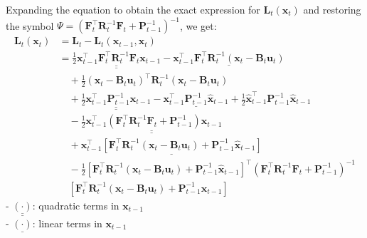\documentclass[10pt]{article}
\begin{document}
Expanding the equation to obtain the exact expression for $\mathbf{L}_t(\mathbf{x}_t)$ and restoring the symbol $\Psi = (\mathbf{F}^{\intercal}_t\mathbf{R}_t^{-1} \mathbf{F}_t+ \mathbf{P}_{t-1}^{-1})^{-1}$, we get:
\begin{equation}
	\begin{aligned}
		\mathbf{L}_t(\mathbf{x}_t) & = \mathbf{L}_t - \mathbf{L}_t(\mathbf{x}_{t-1}, \mathbf{x}_t) \\
		& = \underline{\underline{\frac{1}{2}\mathbf{x}_{t-1}^{\intercal}\mathbf{F}_t^{\intercal}\mathbf{R}_t^{-1}\mathbf{F}_t\mathbf{x}_{t-1} }} - \underline{ \mathbf{x}_{t-1}^{\intercal}\mathbf{F}_t^{\intercal}\mathbf{R}_t^{-1}(\mathbf{x}_t - \mathbf{B}_t \mathbf{u}_t) } \\
		& \quad + \frac{1}{2}(\mathbf{x}_t - \mathbf{B}_t\mathbf{u}_t)^{\intercal}\mathbf{R}_t^{-1}(\mathbf{x}_t - \mathbf{B}_t \mathbf{u}_t) \\
		& \quad + \underline{\underline{ \frac{1}{2} \mathbf{x}_{t-1}^{\intercal}\mathbf{P}_{t-1}^{-1}\mathbf{x}_{t-1} }} - \underline{ \mathbf{x}_{t-1}^{\intercal} \mathbf{P}_{t-1}^{-1}\hat{\mathbf{x}}_{t-1} } + \frac{1}{2}\hat{\mathbf{x}}_{t-1}^{\intercal} \mathbf{P}_{t-1}^{-1} \hat{\mathbf{x}}_{t-1} \\
		& \quad - \underline{\underline{ \frac{1}{2}\mathbf{x}_{t-1}^{\intercal} (\mathbf{F}_t^{\intercal}\mathbf{R}_t^{-1}\mathbf{F}_t + \mathbf{P}_{t-1}^{-1})\mathbf{x}_{t-1} }} \\
		& \quad + \underline{ \mathbf{x}_{t-1}^{\intercal}[\mathbf{F}_t^{\intercal}\mathbf{R}_t^{-1}(\mathbf{x}_t - \mathbf{B}_t \mathbf{u}_t) + \mathbf{P}_{t-1}^{-1}\hat{\mathbf{x}}_{t-1}] } \\
		& \quad -\frac{1}{2} [ \mathbf{F}_t^{\intercal}\mathbf{R}_t^{-1}(\mathbf{x}_t - \mathbf{B}_t \mathbf{u}_t) + \mathbf{P}_{t-1}^{-1}\hat{\mathbf{x}}_{t-1}]^{\intercal} (\mathbf{F}_t^{\intercal} \mathbf{R}_t^{-1}\mathbf{F}_t + \mathbf{P}_{t-1}^{-1})^{-1} \\
		& \quad [ \mathbf{F}_t^{\intercal}\mathbf{R}_t^{-1}(\mathbf{x}_t - \mathbf{B}_t \mathbf{u}_t) + \mathbf{P}_{t-1}^{-1}\hat{\mathbf{x}}_{t-1}]
	\end{aligned}
\end{equation}
- $\underline{\underline{(\cdot)}}$: quadratic terms in $\mathbf{x}_{t-1}$\\
- $\underline{(\cdot)}$: linear terms in $\mathbf{x}_{t-1}$\\
\end{document}
